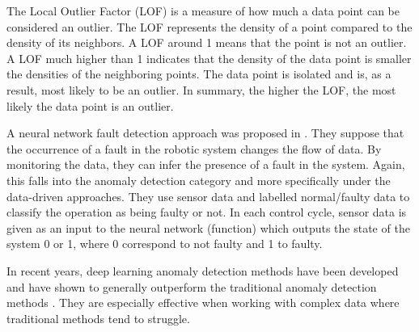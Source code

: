 The Local Outlier Factor (LOF) \cite{breunig2000lof} is a measure of how much a data point can be considered an outlier. The LOF represents the density of a point compared to the density of its neighbors. A LOF around 1 means that the point is not an outlier. A LOF much higher than 1 indicates that the density of the data point is smaller the densities of the neighboring points. The data point is isolated and is, as a result, most likely to be an outlier. In summary, the higher the LOF, the most likely the data point is an outlier. 

A neural network fault detection approach was proposed in \cite{christensen2008faultDetection}. They suppose that the occurrence of a fault in the robotic system changes the flow of data. By monitoring the data, they can infer the presence of a fault in the system. Again, this falls into the anomaly detection category and more specifically under the data-driven approaches. They use sensor data and labelled normal/faulty data to classify the operation as being faulty or not. In each control cycle, sensor data is given as an input to the neural network (function) which outputs the state of the system {0 or 1}, where 0 correspond to not faulty and 1 to faulty. 

In recent years, deep learning anomaly detection methods have been developed and have shown to generally outperform the traditional anomaly detection methods \cite{pang2021deep}. They are especially effective when working with complex data where traditional methods tend to struggle. 


